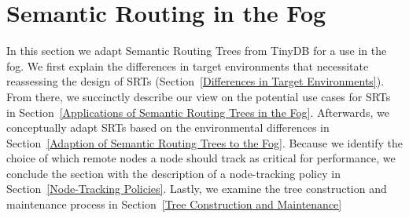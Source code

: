 \section{Semantic Routing in the Fog}
\label{sec:semantic-routing-in-the-fog}

In this section we adapt Semantic Routing Trees from TinyDB for a use in the fog. We first explain the differences in target environments that necessitate reassessing the design of SRTs (Section~\ref{Differences in Target Environments}). From there, we succinctly describe our view on the potential use cases for SRTs in Section~\ref{Applications of Semantic Routing Trees in the Fog}. Afterwards, we conceptually adapt SRTs based on the environmental differences in Section~\ref{Adaption of Semantic Routing Trees to the Fog}. Because we identify the choice of which remote nodes a node should track as critical for performance, we conclude the section with the description of a node-tracking policy in Section~\ref{Node-Tracking Policies}. Lastly, we examine the tree construction and maintenance process in Section~\ref{Tree Construction and Maintenance}

